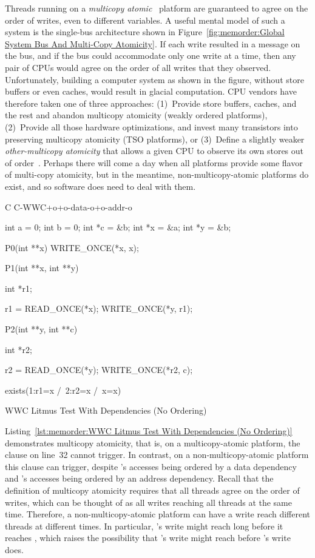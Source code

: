 Threads running on a \emph{multicopy atomic}~\cite{Stone:1995:SP:623262.623912}
platform are guaranteed
to agree on the order of writes, even to different variables.
A useful mental model of such a system is the single-bus architecture
shown in
Figure~\ref{fig:memorder:Global System Bus And Multi-Copy Atomicity}.
If each write resulted in a message on the bus, and if the bus could
accommodate only one write at a time, then any pair of CPUs would
agree on the order of all writes that they observed.
Unfortunately, building a computer system as shown in the figure,
without store buffers or even caches, would result in glacial computation.
CPU vendors have therefore taken one of three approaches:
(1)~Provide store buffers, caches, and the rest and abandon
multicopy atomicity (weakly ordered platforms),
(2)~Provide all those hardware optimizations, and invest many transistors
into preserving multicopy atomicity (TSO platforms), or
(3)~Define a slightly weaker \emph{other-multicopy atomicity} that allows
a given CPU to observe its own stores out of order~\cite{ARMv8A:2017}.
Perhaps there will come a day when all platforms provide some flavor
of multi-copy atomicity, but
in the meantime, non-multicopy-atomic platforms do exist, and so software
does need to deal with them.

\begin{listing}[tbp]
{ \scriptsize
\begin{verbbox}[\LstLineNo]
C C-WWC+o+o-data-o+o-addr-o

{
int a = 0;
int b = 0;
int *c = &b;
int *x = &a;
int *y = &b;
}

P0(int **x)
{
  WRITE_ONCE(*x, x);
}

P1(int **x, int **y)
{
  int *r1;

  r1 = READ_ONCE(*x);
  WRITE_ONCE(*y, r1);
}

P2(int **y, int **c)
{
  int *r2;

  r2 = READ_ONCE(*y);
  WRITE_ONCE(*r2, c);
}

exists(1:r1=x /\ 2:r2=x /\ x=x)
\end{verbbox}
}
\centering
\theverbbox
\caption{WWC Litmus Test With Dependencies (No Ordering)}
\label{lst:memorder:WWC Litmus Test With Dependencies (No Ordering)}
\end{listing}

Listing~\ref{lst:memorder:WWC Litmus Test With Dependencies (No Ordering)}
demonstrates multicopy atomicity, that is, on a multicopy-atomic platform,
the  clause on line~32 cannot trigger.
In contrast, on a non-multicopy-atomic
platform this  clause can trigger, despite
's accesses being ordered by a data dependency and 's
accesses being ordered by an address dependency.
Recall that the definition of multicopy atomicity requires that all
threads agree on the order of writes, which can be thought of as
all writes reaching all threads at the same time.
Therefore, a non-multicopy-atomic platform can have a write reach
different threads at different times.
In particular, 's write might reach  long before it
reaches , which raises the possibility that 's write
might reach  before 's write does.


